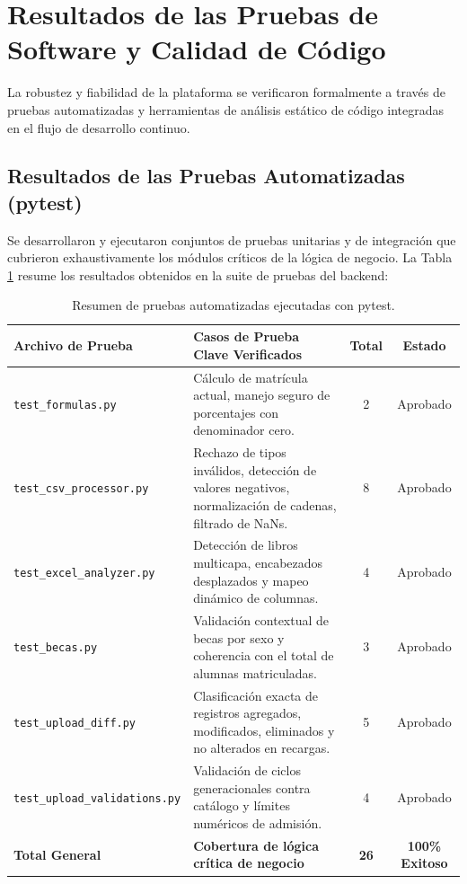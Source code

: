 \section{Resultados de las Pruebas de Software y Calidad de Código}

La robustez y fiabilidad de la plataforma se verificaron formalmente a través de pruebas automatizadas y herramientas de análisis estático de código integradas en el flujo de desarrollo continuo.

\subsection{Resultados de las Pruebas Automatizadas (pytest)}

Se desarrollaron y ejecutaron conjuntos de pruebas unitarias y de integración que cubrieron exhaustivamente los módulos críticos de la lógica de negocio. La Tabla \ref{tab:resultados_pruebas} resume los resultados obtenidos en la suite de pruebas del backend:

\begin{table}[H]
\centering
\footnotesize
\begin{tabular}{|p{4.6cm}|p{5.8cm}|c|c|}
\hline
\textbf{Archivo de Prueba} & \textbf{Casos de Prueba Clave Verificados} & \textbf{Total} & \textbf{Estado} \\
\hline
\texttt{test\_formulas.py} & Cálculo de matrícula actual, manejo seguro de porcentajes con denominador cero. & 2 & Aprobado \\
\hline
\texttt{test\_csv\_processor.py} & Rechazo de tipos inválidos, detección de valores negativos, normalización de cadenas, filtrado de NaNs. & 8 & Aprobado \\
\hline
\texttt{test\_excel\_analyzer.py} & Detección de libros multicapa, encabezados desplazados y mapeo dinámico de columnas. & 4 & Aprobado \\
\hline
\texttt{test\_becas.py} & Validación contextual de becas por sexo y coherencia con el total de alumnas matriculadas. & 3 & Aprobado \\
\hline
\texttt{test\_upload\_diff.py} & Clasificación exacta de registros agregados, modificados, eliminados y no alterados en recargas. & 5 & Aprobado \\
\hline
\texttt{test\_upload\_validations.py} & Validación de ciclos generacionales contra catálogo y límites numéricos de admisión. & 4 & Aprobado \\
\hline
\textbf{Total General} & \textbf{Cobertura de lógica crítica de negocio} & \textbf{26} & \textbf{100\% Exitoso} \\
\hline
\end{tabular}
\caption{Resumen de pruebas automatizadas ejecutadas con pytest.}
\label{tab:resultados_pruebas}
\end{table}

